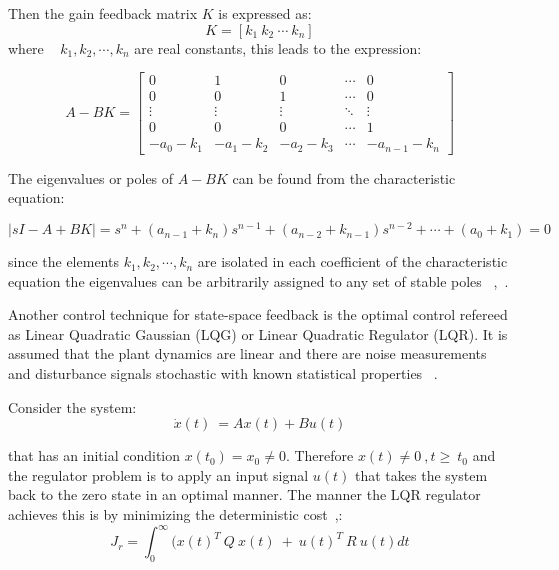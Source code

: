 Then the gain feedback matrix $K$ is expressed as:
\begin{equation}
K= [k_1~k_2~\cdots ~ k_n]
\end{equation}
 where ~ $k_1,k_2,\cdots,k_n$ are real constants, this leads to the expression:
 
 \begin{equation}
 A-BK=\begin{bmatrix}
 0& 1& 0 & \cdots & 0\\
 0 & 0 & 1 & \cdots & 0\\
 \vdots & \vdots & \vdots &\ddots & \vdots \\
 0 & 0 & 0 & \cdots & 1 \\
  -a_0-k_1 & -a_1-k_2 & -a_2-k_3 & \cdots & -a_{n-1}-k_n
 \end{bmatrix}
 \end{equation}
 
 The eigenvalues or poles of $A-BK$ can be found from the characteristic equation:
 
 \begin{equation}
 |sI-A+BK|=s^n +(a_{n-1}+k_n)s^{n-1}+(a_{n-2}+k_{n-1})s^{n-2}+ \cdots + (a_0+k_1) =0
 \end{equation}
 
 since the elements $k_1,k_2,\cdots,k_n$ are isolated in each coefficient of the characteristic equation the eigenvalues can be arbitrarily assigned to any set of stable poles ~\cite[Chapter~10]{Golnaraghi2010},~\cite[Chapter~10]{Ogata2009}.\smallskip
 
Another control technique for state-space feedback is the optimal control refereed as  Linear Quadratic Gaussian (LQG) or Linear Quadratic Regulator (LQR). It is assumed that the plant dynamics are linear and there are noise measurements and disturbance signals stochastic with known statistical properties ~\cite[Chapter~9]{Skogestad}.

Consider the system:
\begin{equation}
	\dot{x}(t)~=Ax(t)+Bu(t)
\end{equation} 

that has an initial condition $x(t_0)=x_0\neq 0$. Therefore $x(t) \neq 0~,t\geq ~t_0$ and the regulator problem is to apply an  input signal $u(t)$ that takes the system back to the zero state in an optimal manner. The manner the LQR regulator achieves this is by minimizing the deterministic cost~\cite[Chapter~9]{Skogestad},\cite[Chapter~3]{Golnaraghi2010}:
\begin{equation}
J_r=\int_{0}^{\infty}(x(t)^T~Q~x(t)~+~ u(t)^T~R~u(t)dt 
\end{equation}

